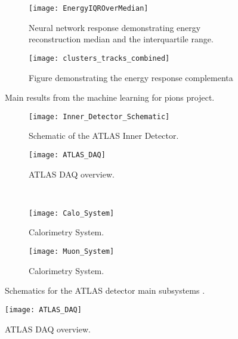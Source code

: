 \documentclass[12pt]{article}
\begin{document}
\begin{figure}[t]
    \centering
    \begin{subfigure}[t]{.48\textwidth}
        \centering
        \texttt{[image: EnergyIQROverMedian]}
        \caption{Neural network response demonstrating energy reconstruction
        median and the interquartile range.}
        \label{sufig:ml4p_energy_response}
    \end{subfigure}
    \hfill
    \begin{subfigure}[t]{.48\textwidth}
        \centering
        \texttt{[image: clusters\_tracks\_combined]}
        \caption{Figure demonstrating the energy response complementa}
        \label{subfig:complimentarity}
    \end{subfigure}
\caption{Main results from the machine learning for pions project.}
\label{fig:ml4p_main_results.}
\end{figure}
\begin{figure}[t]
    \centering
    \begin{subfigure}[t]{.48\textwidth}
        \centering
        \texttt{[image: Inner\_Detector\_Schematic]}
        \caption{Schematic of the ATLAS Inner Detector.}
        \label{subfig:inner_detector_schematic}
    \end{subfigure}
    \hfill
    \begin{subfigure}[t]{.48\textwidth}
        \centering
        \texttt{[image: ATLAS\_DAQ]}
        \caption{ATLAS DAQ overview.}
        \label{subfig:daq_schematic}
    \end{subfigure}
    ~
    \centering
    \begin{subfigure}[t]{.48\textwidth}
        \centering
        \texttt{[image: Calo\_System]}
        \caption{Calorimetry System.}
        \label{subfig:calo_schematic}
    \end{subfigure}
    \hfill
    \begin{subfigure}[t]{.48\textwidth}
        \centering
        \texttt{[image: Muon\_System]}
        \caption{Calorimetry System.}
        \label{subfig:muon_system_schematic}
    \end{subfigure}
\caption{Schematics for the ATLAS detector main subsystems \cite{Aad_2024}.}
\label{fig:ATLAS_Schematics}
\end{figure}

\newpage
\begin{figure}[t]
    \centering
    \texttt{[image: ATLAS\_DAQ]}
    \caption{ATLAS DAQ overview. \cite{Aad_2024}}
    \label{fig:daq_schematic}
\end{figure}
\end{document}
